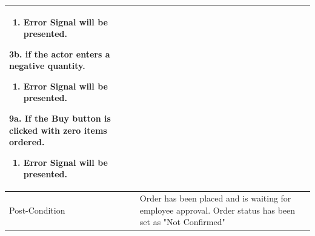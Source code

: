 \documentclass[12pt,a4paper]{article}
\begin{document}
\begin{longtable}{| p{3cm}|p{12cm}|}
\begin{enumerate}
		\item Error Signal will be presented.

	\end{enumerate}

3b. if the actor enters a negative quantity.

 	\begin{enumerate}

		\item Error Signal will be presented.

	\end{enumerate}

9a. If the Buy button is clicked with zero items ordered.

	\begin{enumerate}

		\item Error Signal will be presented.

	\end{enumerate}



\\ \hline

Post-Condition &  Order has been placed and is waiting for employee approval. Order status has been set as "Not Confirmed" \\ \hline

\end{longtable}

\end{document}
